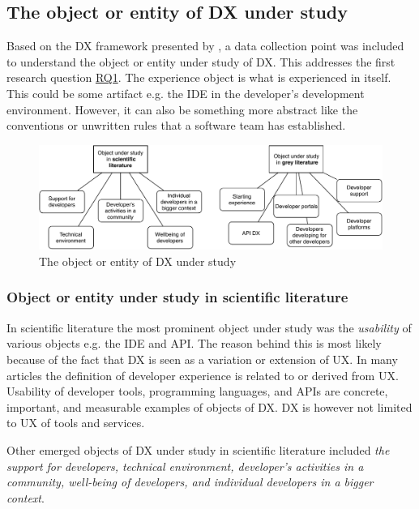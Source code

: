 \documentclass[english, 12pt, a4paper, sci, utf8, a-1b, online]{aaltothesis}
\begin{document}
\subsection{The object or entity of DX under study}

Based on the DX framework presented by \textcite{fagerholm-doctoral-thesis}, a data collection point was included to understand the object or entity under study of DX. This addresses the first research question \hyperref[RQ1]{RQ1}. The experience object is what is experienced in itself. This could be some artifact e.g. the IDE in the developer's development environment. However, it can also be something more abstract like the conventions or unwritten rules that a software team has established.

\begin{figure}[h]
  \begin{center}
    \includegraphics[width=\textwidth]{object-under-study.pdf}
  \end{center}
  \captionsetup{width=0.6\textwidth}
  \caption{The object or entity of DX under study}
  \label{figure:object-under-study}
\end{figure}

\subsubsection{Object or entity under study in scientific literature}

In scientific literature the most prominent object under study was the \textit{usability} of various objects e.g. the IDE and API. The reason behind this is most likely because of the fact that DX is seen as a variation or extension of UX. In many articles the definition of developer experience is related to or derived from UX. Usability of developer tools, programming languages, and APIs are concrete, important, and measurable examples of objects of DX. DX is however not limited to UX of tools and services.

Other emerged objects of DX under study in scientific literature included \textit{the support for developers, technical environment, developer's activities in a community, well-being of developers, and individual developers in a bigger context}.
\end{document}
